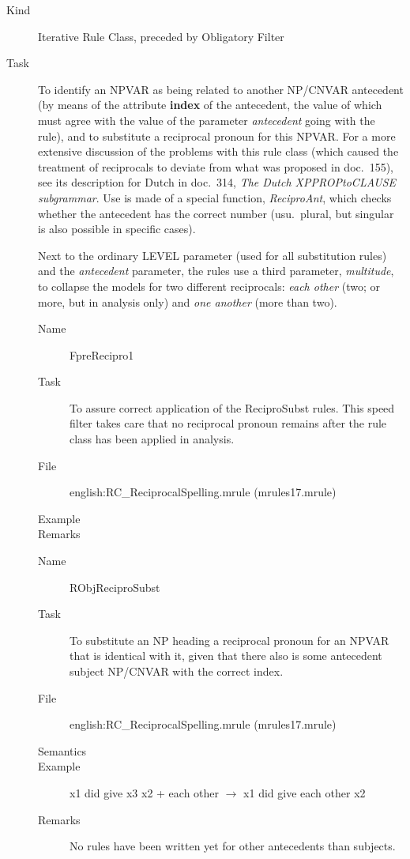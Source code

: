 \begin{description}
\item[Kind] Iterative Rule Class, preceded by Obligatory Filter
\item[Task] To identify an NPVAR as being related to another NP/CNVAR 
antecedent (by means of the attribute {\bf index} of the antecedent, the 
value of which must agree with the value of the parameter {\em antecedent\/}
going with the rule), and to substitute a reciprocal pronoun for this NPVAR. 
For a more extensive discussion of the problems with this rule class (which 
caused the treatment of reciprocals to deviate from what was proposed in doc.\ 
155), see its description for Dutch in doc.\ 314, {\em The Dutch XPPROPtoCLAUSE 
subgrammar\/}.
Use is made of a special function, {\em ReciproAnt\/}, which checks whether the 
antecedent has the correct number (usu.\ plural, but singular is also possible 
in specific cases).

Next to the ordinary LEVEL parameter (used for all substitution rules) and the 
{\em antecedent\/} parameter, the rules use a third parameter, {\em 
multitude\/}, to collapse the models for two different reciprocals: 
{\em each other\/} (two; or more, but in 
analysis only) and {\em one another\/} (more than two).

\vspace{1 cm}
\begin{description}
\item[Name] FpreRecipro1
\item[Task] To assure correct application of the ReciproSubst rules. This speed 
filter takes care that no reciprocal pronoun remains after the rule class has 
been applied in analysis.
\item[File] english:RC\_ReciprocalSpelling.mrule (mrules17.mrule)
\item[Example]
\item[Remarks]
\end{description}

\vspace{1 cm}
\begin{description}
\item[Name] RObjReciproSubst
\item[Task] To substitute an NP heading a reciprocal pronoun for an NPVAR that 
is identical with it, given that there also is some antecedent subject 
NP/CNVAR with the correct index.
\item[File] english:RC\_ReciprocalSpelling.mrule (mrules17.mrule)
\item[Semantics] 
\item[Example] x1 did give x3 x2 + each other $\rightarrow$ x1 did give each 
other x2
\item[Remarks] No rules have been written yet for other antecedents than 
subjects.
\end{description}


\end{description}

